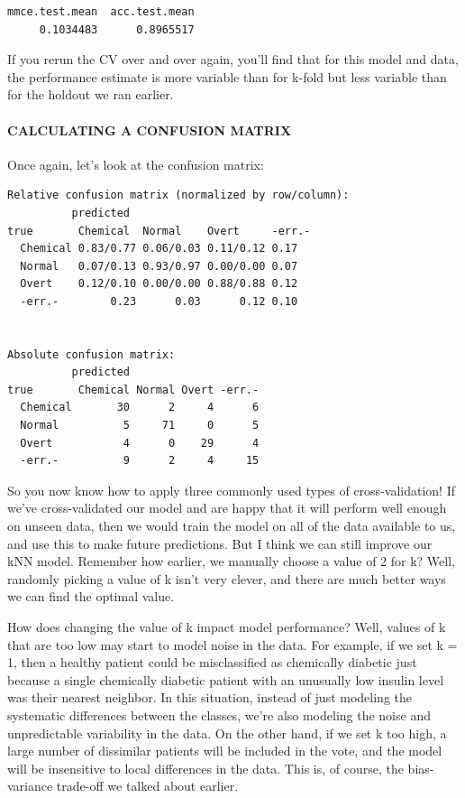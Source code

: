 \documentclass[
]{article}
\newenvironment{Shaded}{\begin{snugshade}}{\end{snugshade}}
\newcommand{\AttributeTok}[1]{\textcolor[rgb]{0.13,0.29,0.53}{#1}}
\newcommand{\ConstantTok}[1]{\textcolor[rgb]{0.56,0.35,0.01}{#1}}
\newcommand{\FunctionTok}[1]{\textcolor[rgb]{0.13,0.29,0.53}{\textbf{#1}}}
\newcommand{\NormalTok}[1]{#1}
\newcommand{\SpecialCharTok}[1]{\textcolor[rgb]{0.81,0.36,0.00}{\textbf{#1}}}
\begin{document}
\begin{verbatim}
mmce.test.mean  acc.test.mean 
     0.1034483      0.8965517 
\end{verbatim}

If you rerun the CV over and over again, you'll find that for this model
and data, the performance estimate is more variable than for k-fold but
less variable than for the holdout we ran earlier.

\paragraph{CALCULATING A CONFUSION
MATRIX}\label{calculating-a-confusion-matrix}

Once again, let's look at the confusion matrix:

\begin{Shaded}
\end{Shaded}

\begin{verbatim}
Relative confusion matrix (normalized by row/column):
          predicted
true       Chemical  Normal    Overt     -err.-   
  Chemical 0.83/0.77 0.06/0.03 0.11/0.12 0.17     
  Normal   0.07/0.13 0.93/0.97 0.00/0.00 0.07     
  Overt    0.12/0.10 0.00/0.00 0.88/0.88 0.12     
  -err.-        0.23      0.03      0.12 0.10     


Absolute confusion matrix:
          predicted
true       Chemical Normal Overt -err.-
  Chemical       30      2     4      6
  Normal          5     71     0      5
  Overt           4      0    29      4
  -err.-          9      2     4     15
\end{verbatim}

So you now know how to apply three commonly used types of
cross-validation! If we've cross-validated our model and are happy that
it will perform well enough on unseen data, then we would train the
model on all of the data available to us, and use this to make future
predictions. But I think we can still improve our kNN model. Remember
how earlier, we manually choose a value of 2 for k? Well, randomly
picking a value of k isn't very clever, and there are much better ways
we can find the optimal value.

How does changing the value of k impact model performance? Well, values
of k that are too low may start to model noise in the data. For example,
if we set k = 1, then a healthy patient could be misclassified as
chemically diabetic just because a single chemically diabetic patient
with an unusually low insulin level was their nearest neighbor. In this
situation, instead of just modeling the systematic differences between
the classes, we're also modeling the noise and unpredictable variability
in the data. On the other hand, if we set k too high, a large number of
dissimilar patients will be included in the vote, and the model will be
insensitive to local differences in the data. This is, of course, the
bias-variance trade-off we talked about earlier.
\end{document}
